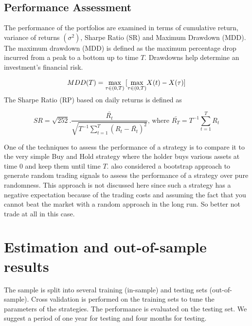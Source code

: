 \documentclass[11pt,a4,twosided,singlespacing,titlepagenumber=on]{scrreprt}
\numberwithin{equation}{chapter} %
\theoremstyle{remark}
\begin{document}
\subsection{Performance Assessment}
The performance of the portfolios are examined in terms of cumulative return, variance of returns $(\sigma^2)$, Sharpe Ratio (SR) and Maximum Drawdown (MDD). The maximum drawdown (MDD) is defined as the maximum percentage drop incurred from a peak to a bottom up to time $T$. Drawdowns help determine an investment's financial risk.

\begin{equation}
MDD(T) = \smash{\displaystyle\max_{\tau \in (0,T)}} \left[\smash{\displaystyle\max_{\tau \in (0,T)}} X(t) - X(\tau) \right] 
\end{equation}

The Sharpe Ratio (RP) based on daily returns is defined as

\begin{equation}
SR =  \sqrt{252 }  . \frac{\bar{R_t}}{\sqrt{T^{-1} \sum_{t=1}^T (R_t - \bar{R_t})^2 }} \text{, where } \bar{R_T} = T^{-1} \sum_{t=1}^T R_t 
\end{equation}

One of the techniques to assess the performance of a strategy is to compare it to the very simple Buy and Hold strategy where the holder buys various assets at time $0$ and keep them until time $T$. \cite{gatev2006} also considered a bootstrap approach to generate random trading signals to assess the performance of a strategy over pure randomness. This approach is not discussed here since such a strategy has a negative expectation because of the trading costs and assuming the fact that you cannot beat the market with a random approach in the long run. So better not trade at all in this case.

\section{Estimation and out-of-sample results}
The sample is split into several training (in-sample) and testing sets (out-of-sample). Cross validation is performed on the training sets to tune the parameters of the strategies. The performance is evaluated on the testing set. We suggest a period of one year for testing and four months for testing.
\end{document}
